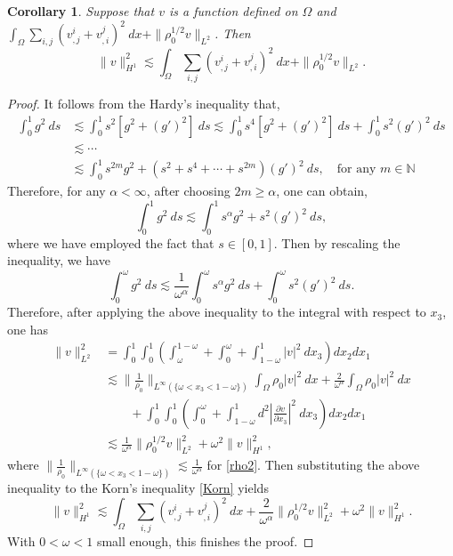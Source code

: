 \documentclass[12pt,a4paper]{amsart}
\numberwithin{equation}{section}
\theoremstyle{plain}
\newtheorem{Cor}[Thm]{Corollary}
\theoremstyle{definition}
\begin{document}
\begin{Cor}
	Suppose that $v$ is a function defined on $\Omega$ and $\int_{\Omega} \sum\limits_{i,j}(v^i_{,j} +v^j_{,i})^2\ dx+\|\rho_0^{1/2} v\|_{L^2}$. Then
	\begin{equation}\label{Korn2}
	\|v\|_{H^1}^2\lesssim \int_{\Omega} \sum\limits_{i,j}(v^i_{,j} +v^j_{,i})^2\ dx+\|\rho_0^{1/2} v\|_{L^2}.
	\end{equation}
\end{Cor}
\begin{proof}
	It follows from the Hardy's inequality that,
	\begin{align*}
	\int_{0}^{1}g^2 \ ds&\lesssim\int_{0}^{1}s^2[g^2+(g')^2]\ ds\lesssim  \int_{0}^{1}s^4[g^2+(g')^2]\ ds+ \int_{0}^{1}s^2(g')^2\ ds\\
	&\lesssim \cdots\\
	&\lesssim \int_{0}^{1}s^{2m}g^2+(s^2+s^4+\cdots+s^{2m})(g')^2\ ds,\quad \text{for any~}m\in\mathbb{N}
	\end{align*}
    Therefore, for any $\alpha<\infty$, after choosing $2m\geq \alpha$, one can obtain, 
	\begin{equation*}
	\int_{0}^{1}g^2 \ ds\lesssim \int_{0}^{1}s^{\alpha}g^2+s^2(g')^2\ ds,
	\end{equation*}
	where we have employed the fact that $s\in[0,1]$.
	Then by rescaling the inequality, we have
	$$
	\int_{0}^{\omega}g^2 \ ds \lesssim \frac{1}{\omega^{\alpha}}\int_{0}^{\omega}s^{\alpha}g^2\ ds
	+\int_{0}^{\omega}s^2(g')^2 \ ds.
	$$
	Therefore, after applying the above inequality to the integral with respect to $x_3$, one has
	$$
	\begin{aligned}
	\|v\|_{L^2}^2&=\int_{0}^{1}\int_{0}^{1}\left( \int_{\omega}^{1-\omega}+\int_{0}^{\omega}+\int_{1-\omega}^{1}|v|^2 \ dx_3\right) dx_2 dx_1\\
	&\lesssim \|\frac{1}{\rho_0}\|_{L^{\infty}(\{\omega<x_3<1-\omega\})}\int_{\Omega}\rho_0 |v|^2 \ dx+ \frac{2}{\omega^{\alpha}}\int_{\Omega}\rho_0 |v|^2\ dx \\
	&\qquad +  \int_{0}^{1}\int_{0}^{1}\left( \int_{0}^{\omega}+\int_{1-\omega}^{1} d^2 \left|\frac{\partial v}{\partial x_3}\right|^2 \ dx_3\right) dx_2 dx_1\\
	&\lesssim \frac{1}{\omega^{\alpha}} \|\rho_0^{1/2} v\|_{L^2}^2 + \omega^2 \|v\|_{H^1}^2,
	\end{aligned}
	$$
	where $\|\frac{1}{\rho_0}\|_{L^{\infty}(\{\omega<x_3<1-\omega\})}\lesssim \frac{1}{\omega^{\alpha}}$ for \eqref{rho2}.
	Then substituting the above inequality to the Korn's inequality \eqref{Korn} yields
     $$	
     \|v\|_{H^1}^2\lesssim \int_{\Omega} \sum\limits_{i,j}(v^i_{,j} +v^j_{,i})^2\ dx+\frac{2}{\omega^{\alpha}} \|\rho_0^{1/2} v\|_{L^2}^2 + \omega^2 \|v\|_{H^1}^2.
     $$
	With $0<\omega<1$ small enough, this finishes the proof.
\end{proof}
\end{document}
